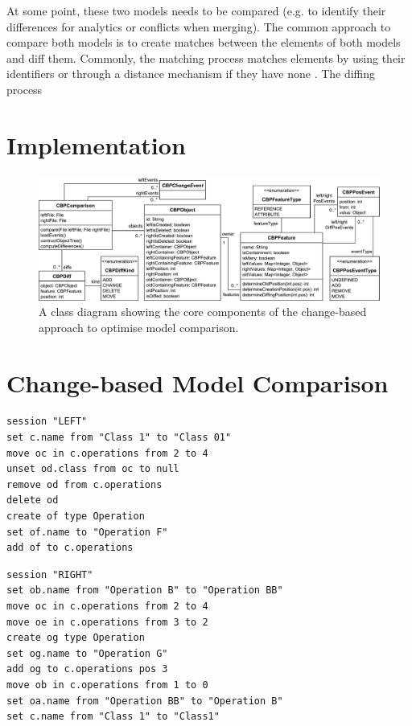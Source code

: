 \documentclass{llncs}
\begin{document}
At some point, these two models needs to be compared (e.g. to identify their differences for analytics or conflicts when merging). The common approach to compare both models is to create matches between the elements of both models and diff them. Commonly, the matching process matches elements by using their identifiers or through a distance mechanism if they have none \cite{}. The diffing process 

\section{Implementation}
\label{sec:implementation}

\begin{figure}
    \includegraphics[width=\linewidth]{images/TreeClassDiagram}
    \caption{A class diagram showing the core components of the change-based approach to optimise model comparison.}
    \label{fig:approach_class_diagram}
\end{figure}

\section{Change-based Model Comparison}
\label{sec:change-based_model_comparison}

\begin{minipage}[t]{0.49\linewidth}    
\begin{lstlisting}[firstnumber=24,style=eol,caption={The left version.},label=lst:leftcbp]
session "LEFT"
set c.name from "Class 1" to "Class 01"
move oc in c.operations from 2 to 4
unset od.class from oc to null
remove od from c.operations
delete od
create of type Operation
set of.name to "Operation F"
add of to c.operations
\end{lstlisting}
\end{minipage}
\hfill
\begin{minipage}[t]{0.49\linewidth}
\begin{lstlisting}[firstnumber=24,style=eol,caption={The right version.},label=lst:rightcbp]
session "RIGHT"
set ob.name from "Operation B" to "Operation BB"
move oc in c.operations from 2 to 4
move oe in c.operations from 3 to 2
create og type Operation
set og.name to "Operation G" 
add og to c.operations pos 3
move ob in c.operations from 1 to 0
set oa.name from "Operation BB" to "Operation B"
set c.name from "Class 1" to "Class1"
\end{lstlisting}
\end{minipage}
\end{document}
